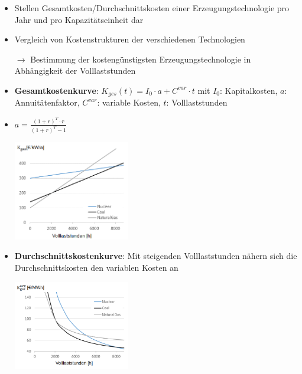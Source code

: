 \begin{itemize}
	\item Stellen Gesamtkosten/Durchschnittskosten einer Erzeugungstechnologie pro Jahr und pro Kapazitätseinheit dar
	\item Vergleich von Kostenstrukturen der verschiedenen Technologien
	
	$\rightarrow$ Bestimmung der kostengünstigsten Erzeugungstechnologie in Abhängigkeit der Volllaststunden
	
	\item \textbf{Gesamtkostenkurve}: $K_{ges}(t)=I_0\cdot a+ C^{var}\cdot t$ mit $I_0$: Kapitalkosten, $a$: Annuitätenfaktor, $C^{var}$: variable Kosten, $t$: Volllaststunden
	\item $a=\frac{(1+r)^T\cdot r}{(1+r)^T -1}$
	\begin{center}
		\includegraphics[width=0.4\textwidth]{images/gkk.png}
	\end{center}

	\item \textbf{Durchschnittskostenkurve}: Mit steigenden Volllaststunden nähern sich die
	Durchschnittskosten den variablen Kosten an
	\begin{center}
		\includegraphics[width=0.4\textwidth]{images/dkk.png}
	\end{center}
\end{itemize}

